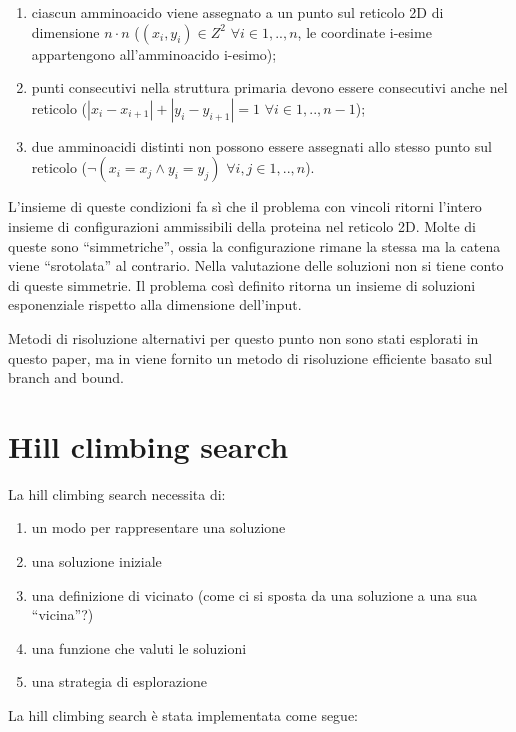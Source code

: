 \documentclass[conference]{IEEEtran}
\newcommand{\abs}[1]{\left|#1\right|}
\begin{document}
\begin{enumerate}
 \item ciascun amminoacido viene assegnato a un punto sul reticolo 2D di dimensione $n \cdot n$ ($(x_i, y_i) \in Z^2$ $\forall i \in 1,..,n$, le coordinate i-esime appartengono all'amminoacido i-esimo);
 \item punti consecutivi nella struttura primaria devono essere consecutivi anche nel reticolo ($\abs{x_i - x_{i+1}} + \abs{y_i - y_{i+1}} = 1 $ $\forall i \in 1,..,n-1$);
 \item due amminoacidi distinti non possono essere assegnati allo stesso punto sul reticolo ($ \neg (x_i = x_j \land y_i = y_j)$ $\forall i,j \in 1,..,n$).
\end{enumerate}

L'insieme di queste condizioni fa sì che il problema con vincoli ritorni l'intero insieme di configurazioni ammissibili della proteina nel reticolo 2D. Molte di queste sono ``simmetriche'', ossia la configurazione rimane la stessa ma la catena viene ``srotolata'' al contrario. Nella valutazione delle soluzioni non si tiene conto di queste simmetrie. Il problema così definito ritorna un insieme di soluzioni esponenziale rispetto alla dimensione dell'input.

Metodi di risoluzione alternativi per questo punto non sono stati esplorati in questo paper, ma in \cite{BranchBound} viene fornito un metodo di risoluzione efficiente basato sul branch and bound.

\section{Hill climbing search}

La hill climbing search necessita di:

\begin{enumerate}
 \item un modo per rappresentare una soluzione
 \item una soluzione iniziale
 \item una definizione di vicinato (come ci si sposta da una soluzione a una sua ``vicina''?)
 \item una funzione che valuti le soluzioni
 \item una strategia di esplorazione
\end{enumerate}

La hill climbing search è stata implementata come segue:
\end{document}
